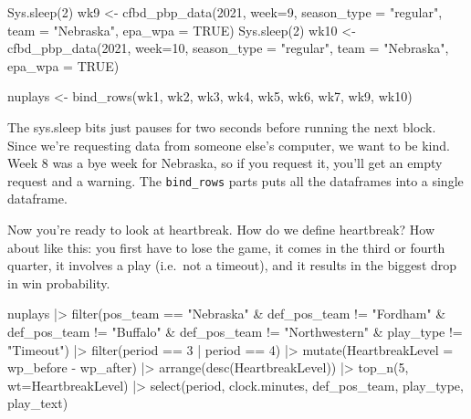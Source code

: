 \documentclass[
  letterpaper,
  DIV=11,
  numbers=noendperiod]{scrreprt}
\newenvironment{Shaded}{\begin{snugshade}}{\end{snugshade}}
\newcommand{\AttributeTok}[1]{\textcolor[rgb]{0.40,0.45,0.13}{#1}}
\newcommand{\ConstantTok}[1]{\textcolor[rgb]{0.56,0.35,0.01}{#1}}
\newcommand{\DecValTok}[1]{\textcolor[rgb]{0.68,0.00,0.00}{#1}}
\newcommand{\FunctionTok}[1]{\textcolor[rgb]{0.28,0.35,0.67}{#1}}
\newcommand{\NormalTok}[1]{\textcolor[rgb]{0.00,0.23,0.31}{#1}}
\newcommand{\OtherTok}[1]{\textcolor[rgb]{0.00,0.23,0.31}{#1}}
\newcommand{\SpecialCharTok}[1]{\textcolor[rgb]{0.37,0.37,0.37}{#1}}
\newcommand{\StringTok}[1]{\textcolor[rgb]{0.13,0.47,0.30}{#1}}
\begin{document}
\begin{Shaded}
\begin{Highlighting}[]
\FunctionTok{Sys.sleep}\NormalTok{(}\DecValTok{2}\NormalTok{)}
\NormalTok{wk9 }\OtherTok{\textless{}{-}} \FunctionTok{cfbd\_pbp\_data}\NormalTok{(}\DecValTok{2021}\NormalTok{, }\AttributeTok{week=}\DecValTok{9}\NormalTok{, }\AttributeTok{season\_type =} \StringTok{"regular"}\NormalTok{, }\AttributeTok{team =} \StringTok{"Nebraska"}\NormalTok{, }\AttributeTok{epa\_wpa =} \ConstantTok{TRUE}\NormalTok{)}
\FunctionTok{Sys.sleep}\NormalTok{(}\DecValTok{2}\NormalTok{)}
\NormalTok{wk10 }\OtherTok{\textless{}{-}} \FunctionTok{cfbd\_pbp\_data}\NormalTok{(}\DecValTok{2021}\NormalTok{, }\AttributeTok{week=}\DecValTok{10}\NormalTok{, }\AttributeTok{season\_type =} \StringTok{"regular"}\NormalTok{, }\AttributeTok{team =} \StringTok{"Nebraska"}\NormalTok{, }\AttributeTok{epa\_wpa =} \ConstantTok{TRUE}\NormalTok{)}

\NormalTok{nuplays }\OtherTok{\textless{}{-}} \FunctionTok{bind\_rows}\NormalTok{(wk1, wk2, wk3, wk4, wk5, wk6, wk7, wk9, wk10)}
\end{Highlighting}
\end{Shaded}

The sys.sleep bits just pauses for two seconds before running the next
block. Since we're requesting data from someone else's computer, we want
to be kind. Week 8 was a bye week for Nebraska, so if you request it,
you'll get an empty request and a warning. The \texttt{bind\_rows} parts
puts all the dataframes into a single dataframe.

Now you're ready to look at heartbreak. How do we define heartbreak? How
about like this: you first have to lose the game, it comes in the third
or fourth quarter, it involves a play (i.e.~not a timeout), and it
results in the biggest drop in win probability.

\begin{Shaded}
\begin{Highlighting}[]
\NormalTok{nuplays }\SpecialCharTok{|\textgreater{}} 
  \FunctionTok{filter}\NormalTok{(pos\_team }\SpecialCharTok{==} \StringTok{"Nebraska"} \SpecialCharTok{\&}\NormalTok{ def\_pos\_team }\SpecialCharTok{!=} \StringTok{"Fordham"} \SpecialCharTok{\&}\NormalTok{ def\_pos\_team }\SpecialCharTok{!=} \StringTok{"Buffalo"} \SpecialCharTok{\&}\NormalTok{ def\_pos\_team }\SpecialCharTok{!=} \StringTok{"Northwestern"} \SpecialCharTok{\&}\NormalTok{ play\_type }\SpecialCharTok{!=} \StringTok{"Timeout"}\NormalTok{) }\SpecialCharTok{|\textgreater{}} 
  \FunctionTok{filter}\NormalTok{(period }\SpecialCharTok{==} \DecValTok{3} \SpecialCharTok{|}\NormalTok{ period }\SpecialCharTok{==} \DecValTok{4}\NormalTok{) }\SpecialCharTok{|\textgreater{}} 
  \FunctionTok{mutate}\NormalTok{(}\AttributeTok{HeartbreakLevel =}\NormalTok{ wp\_before }\SpecialCharTok{{-}}\NormalTok{ wp\_after) }\SpecialCharTok{|\textgreater{}} 
  \FunctionTok{arrange}\NormalTok{(}\FunctionTok{desc}\NormalTok{(HeartbreakLevel)) }\SpecialCharTok{|\textgreater{}} 
  \FunctionTok{top\_n}\NormalTok{(}\DecValTok{5}\NormalTok{, }\AttributeTok{wt=}\NormalTok{HeartbreakLevel) }\SpecialCharTok{|\textgreater{}}
  \FunctionTok{select}\NormalTok{(period, clock.minutes, def\_pos\_team, play\_type, play\_text)}
\end{Highlighting}
\end{Shaded}
\end{document}
